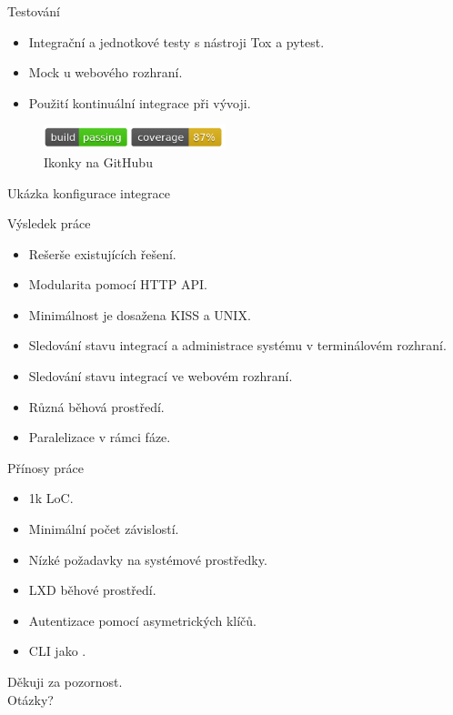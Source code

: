 \documentclass{beamer}
\begin{document}
\begin{frame}{Testování}
\begin{itemize}
	\item Integrační a jednotkové testy s nástroji Tox a pytest.
	\item Mock u webového rozhraní.
	\item Použití kontinuální integrace při vývoji.
\end{itemize}
\begin{figure}
\includegraphics[width=150pt]{img/piper-ci-badges.png}
\caption{Ikonky na GitHubu}
\end{figure}
\end{frame}

\begin{frame}{Ukázka konfigurace integrace}
	\exampleCode{}
\end{frame}

\begin{frame}{Výsledek práce}
\begin{itemize}
	\item Rešerše existujících řešení.
	\item Modularita pomocí HTTP API.
	\item Minimálnost je dosažena KISS a UNIX.
	\item Sledování stavu integrací a administrace systému v terminálovém rozhraní.
	\item Sledování stavu integrací ve webovém rozhraní.
	\item Různá běhová prostředí.
	\item Paralelizace v rámci fáze.
\end{itemize}
\end{frame}

\begin{frame}{Přínosy práce}
\begin{itemize}
	\item 1k LoC.
	\item Minimální počet závislostí.
	\item Nízké požadavky na systémové prostředky.
	\item LXD běhové prostředí.
	\item Autentizace pomocí asymetrických klíčů.
	\item CLI jako .
\end{itemize}
\end{frame}

\begin{frame}[standout]
	Děkuji za pozornost. \\
	\bigskip\bigskip\bigskip
	Otázky?
\end{frame}
\end{document}
